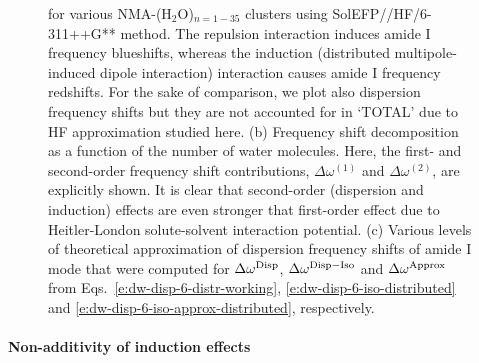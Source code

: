 \documentclass[b5paper,oneside,fleqn,11pt]{book}
\begin{document}
\begin{refsection}
\begin{figure}[t!]
{for various NMA-(H$_2$O)$_{n = 1-35}$ clusters using 
SolEFP//HF/6-311++G** method. The repulsion interaction induces amide I
frequency blueshifts, whereas the induction (distributed multipole\hyp{}induced
dipole interaction) interaction causes amide I frequency redshifts.
For the sake of comparison, we plot also dispersion frequency shifts
but they are not accounted for in `TOTAL' due to HF approximation studied here.
(b) Frequency shift decomposition as a function of the number of water molecules.
Here, the first\hyp{} and second\hyp{}order frequency shift contributions,
$\Delta\omega^{(1)}$ and $\Delta\omega^{(2)}$, are explicitly shown. It is clear
that second\hyp{}order (dispersion and induction) effects are even stronger 
that first\hyp{}order effect due to Heitler\hyp{}London solute\hyp{}solvent
interaction potential.
(c) Various levels of theoretical approximation of dispersion frequency
shifts of amide I mode that were computed for $\Delta\omega^{\rm Disp}$,
$\Delta\omega^{\rm Disp-Iso}$ and $\Delta\omega^{\rm Approx}$ 
from Eqs.~\eqref{e:dw-disp-6-distr-working}, \eqref{e:dw-disp-6-iso-distributed} 
and \eqref{e:dw-disp-6-iso-approx-distributed}, respectively.
\label{f:nma-water-rhf}}
\end{figure}
%

\paragraph{Non\hyp{}additivity of induction effects}


\end{refsection}
\end{document}
